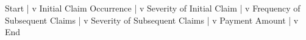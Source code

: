 Start
    |
    v
Initial Claim Occurrence
    |
    v
Severity of Initial Claim
    |
    v
Frequency of Subsequent Claims
    |
    v
Severity of Subsequent Claims
    |
    v
Payment Amount
    |
    v
End